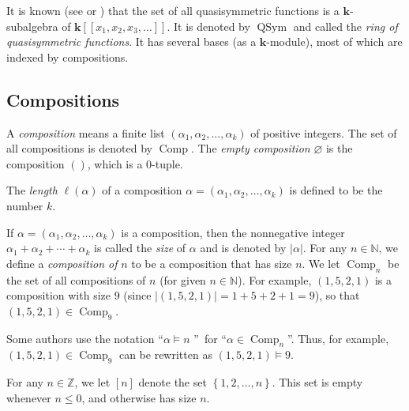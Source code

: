 \documentclass[numbers=enddot,12pt,final,onecolumn,notitlepage]{scrartcl}%
\theoremstyle{definition}
\newenvironment{verlong}{}{}
\begin{document}
It is known (see \cite[Corollaire 4.7]{Malven93} or \cite[Proposition
5.1.3]{GriRei}) that the set of all quasisymmetric functions is a $\mathbf{k}%
$-subalgebra of $\mathbf{k}\left[  \left[  x_{1},x_{2},x_{3},\ldots\right]
\right]  $. It is denoted by $\operatorname*{QSym}$ and called the \emph{ring
of quasisymmetric functions}. It has several bases (as a $\mathbf{k}$-module),
most of which are indexed by compositions.

\subsection{Compositions}

A \emph{composition} means a finite list $\left(  \alpha_{1},\alpha_{2}%
,\ldots,\alpha_{k}\right)  $ of positive integers. The set of all compositions
is denoted by $\operatorname*{Comp}$. The \emph{empty composition
}$\varnothing$ is the composition $\left(  {}\right)  $, which is a $0$-tuple.

The \emph{length }$\ell\left(  \alpha\right)  $ of a composition
$\alpha=\left(  \alpha_{1},\alpha_{2},\ldots,\alpha_{k}\right)  $ is defined
to be the number $k$.

If $\alpha=\left(  \alpha_{1},\alpha_{2},\ldots,\alpha_{k}\right)  $ is a
composition, then the nonnegative integer $\alpha_{1}+\alpha_{2}+\cdots
+\alpha_{k}$ is called the \emph{size} of $\alpha$ and is denoted by
$\left\vert \alpha\right\vert $. For any $n\in\mathbb{N}$, we define a
\emph{composition of }$n$ to be a composition that has size $n$. We let
$\operatorname*{Comp}\nolimits_{n}$ be the set of all compositions of $n$ (for
given $n\in\mathbb{N}$). For example, $\left(  1,5,2,1\right)  $ is a
composition with size $9$ (since $\left\vert \left(  1,5,2,1\right)
\right\vert =1+5+2+1=9$), so that $\left(  1,5,2,1\right)  \in
\operatorname*{Comp}\nolimits_{9}$.

\begin{verlong}
Some authors use the notation \textquotedblleft$\alpha\models n$%
\textquotedblright\ for \textquotedblleft$\alpha\in\operatorname*{Comp}%
\nolimits_{n}$\textquotedblright. Thus, for example, $\left(  1,5,2,1\right)
\in\operatorname*{Comp}\nolimits_{9}$ can be rewritten as $\left(
1,5,2,1\right)  \models9$.
\end{verlong}

For any $n\in\mathbb{Z}$, we let $\left[  n\right]  $ denote the set $\left\{
1,2,\ldots,n\right\}  $. This set is empty whenever $n\leq0$, and otherwise
has size $n$.
\end{document}
